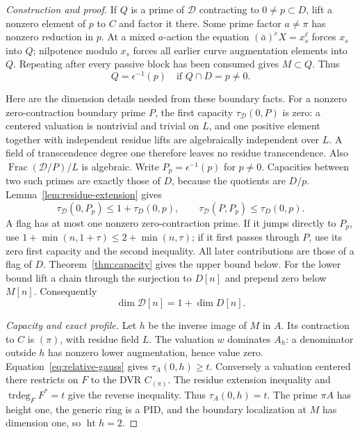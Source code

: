 \documentclass[11pt,reqno]{amsart}
\numberwithin{equation}{section}
\theoremstyle{plain}
\theoremstyle{definition}
\theoremstyle{remark}
\begin{document}
\begin{proof}[Construction and proof]
If \(Q\) is a prime of \(\mathcal D\) contracting to
\(0\ne p\subset D\), lift a nonzero element of \(p\) to
\(C\) and factor it there.  Some prime factor \(a\ne\pi\)
has nonzero reduction in \(p\).  At a mixed \(a\)-action the
equation \((\bar a)^eX=x_s^\ell\) forces \(x_s\) into
\(Q\); nilpotence modulo \(x_s\) forces all earlier curve
augmentation elements into \(Q\).  Repeating after every
passive block has been consumed gives \(M\subset Q\).  Thus
\begin{equation}\label{eq:relative-boundary-primes}
Q=\epsilon^{-1}(p)\quad\text{if }Q\cap D=p\ne0.
\end{equation}

Here are the dimension details needed from these boundary facts.
For a nonzero zero-contraction boundary prime \(P\), the first
capacity \(\tau_{\mathcal D}(0,P)\) is zero: a centered
valuation is nontrivial and trivial on \(L\), and one positive
element together with independent residue lifts are algebraically
independent over \(L\).  A field of transcendence degree one
therefore leaves no residue transcendence.  Also
\(\operatorname{Frac}(\mathcal D/P)/L\) is algebraic.  Write
\(P_p=\epsilon^{-1}(p)\) for \(p\ne0\).  Capacities between
two such primes are exactly those of \(D\), because the
quotients are \(D/p\).  Lemma~\ref{lem:residue-extension} gives
\[
 \tau_{\mathcal D}(0,P_p)\le1+\tau_D(0,p),\qquad
 \tau_{\mathcal D}(P,P_p)\le\tau_D(0,p).
\]
A flag has at most one nonzero zero-contraction prime.  If it
jumps directly to \(P_p\), use
\(1+\min(n,1+\tau)\le2+\min(n,\tau)\); if it first
passes through \(P\), use its zero first capacity and the
second inequality.  All later contributions are those of a
flag of \(D\).  Theorem~\ref{thm:capacity} gives the upper
bound below.  For the lower bound lift a chain through the
surjection to \(D[n]\) and prepend zero below \(M[n]\).
Consequently
\begin{equation}\label{eq:relative-boundary-profile}
\dim\mathcal D[n]=1+\dim D[n].
\end{equation}

\smallskip\noindent\emph{Capacity and exact profile.}
Let \(h\) be the inverse image of \(M\) in \(A\).  Its
contraction to \(C\) is \((\pi)\), with residue field \(L\).
The valuation \(w\) dominates \(A_h\): a denominator outside
\(h\) has nonzero lower augmentation, hence value zero.
Equation~\eqref{eq:relative-gauss} gives \(\tau_A(0,h)\ge t\).
Conversely a valuation centered there restricts on \(F\) to
the DVR \(C_{(\pi)}\).  The residue extension inequality and
\(\operatorname{trdeg}_F F^*=t\) give the reverse inequality.
Thus \(\tau_A(0,h)=t\).  The prime \(\pi A\) has height
one, the generic ring is a PID, and the boundary localization
at \(M\) has dimension one, so \(\operatorname{ht}h=2\).


\end{proof}
\end{document}
